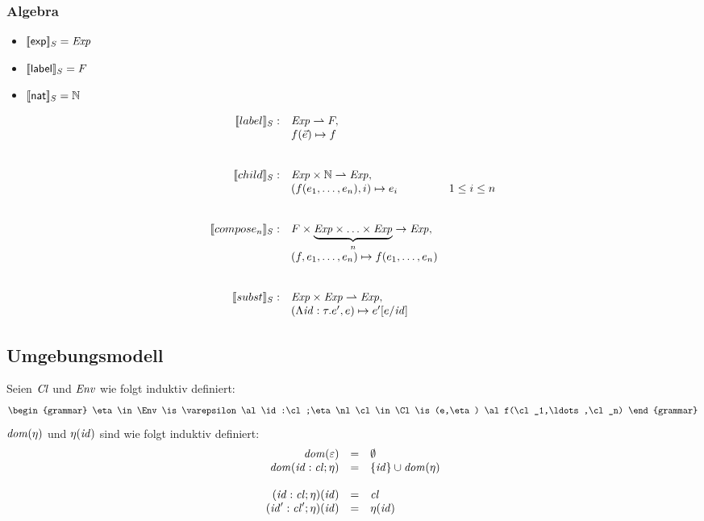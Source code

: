 \documentclass[12pt,a4paper]{article}
\begin{document}
\subsubsection*{Algebra}

\begin{itemize}
\item $[\![\mathsf{exp}]\!]_S = \mathit{Exp}$
\item $[\![\mathsf{label}]\!]_S = F$
\item $[\![\mathsf{nat}]\!]_S = \mathbb N$
\end{itemize}

\[\begin{array}{rll}
  \sem{label}_S: & \Exp \pto F, \\
  & f(\vec{e}) \mapsto f \\
  \\\\
  \sem{child}_S: & \Exp \times \N \pto \Exp, \\
  & (f(e_1,\ldots,e_n),i) \mapsto e_i & 1 \le i \le n \\
  \\\\
  \sem{compose_n}_S: & F \times \underbrace{\Exp \times \ldots \times \Exp}_n \to \Exp, \\
  & (f, e_1,\ldots,e_n) \mapsto f(e_1,\ldots,e_n) \\
  \\\\
  \sem{subst}_S: & \Exp \times \Exp \pto \Exp, \\
  & (\Lambda\id:\tau.e',e) \mapsto e'[e/\id] \\
\end{array}\]


\subsection*{Umgebungsmodell}

Seien $\mathit{Cl}$ und $\mathit{Env}$ wie folgt induktiv definiert:
\[\begin{grammar}
  \eta \in \Env
  \is \varepsilon
  \al \id:\cl;\eta
  \nl
  \cl \in \Cl
  \is (e,\eta)
  \al f(\cl_1,\ldots,\cl_n)
\end{grammar}\]
$\mathit{dom}(\eta)$ und $\eta(\mathit{id})$ sind wie folgt induktiv definiert:
\[\begin{array}{rcl}
  \mathit{dom}(\varepsilon) &=& \emptyset \\
  \mathit{dom}(\mathit{id}:\mathit{cl};\eta) &=& \{\mathit{id}\} \cup \mathit{dom}(\eta) \\
  \\
  (\mathit{id}:\mathit{cl};\eta)(\mathit{id}) &=& \mathit{cl} \\
  (\mathit{id}':\mathit{cl}';\eta)(\mathit{id}) &=& \eta(\mathit{id}) \\
\end{array}\]
\end{document}
